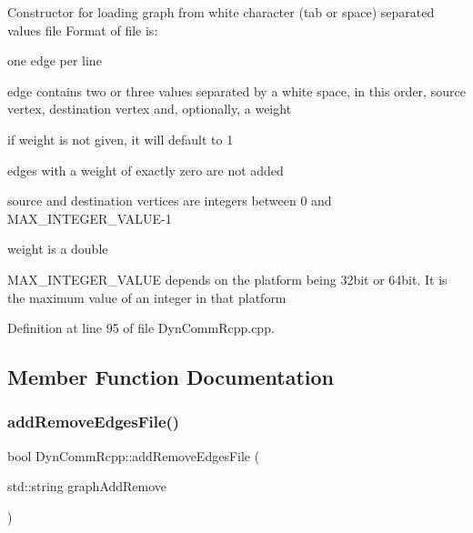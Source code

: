 Constructor for loading graph from white character (tab or space) separated values file Format of file is\+:
\begin{DoxyItemize}
\item one edge per line
\item edge contains two or three values separated by a white space, in this order, source vertex, destination vertex and, optionally, a weight
\item if weight is not given, it will default to 1
\item edges with a weight of exactly zero are not added
\item source and destination vertices are integers between 0 and M\+A\+X\+\_\+\+I\+N\+T\+E\+G\+E\+R\+\_\+\+V\+A\+L\+U\+E-\/1
\item weight is a double
\item M\+A\+X\+\_\+\+I\+N\+T\+E\+G\+E\+R\+\_\+\+V\+A\+L\+UE depends on the platform being 32bit or 64bit. It is the maximum value of an integer in that platform 
\end{DoxyItemize}

Definition at line 95 of file Dyn\+Comm\+Rcpp.\+cpp.



\subsection{Member Function Documentation}
\mbox{\label{classDynCommRcpp_a9080af5a73f77db6eff4d7a41596902a}} 
\subsubsection{\texorpdfstring{add\+Remove\+Edges\+File()}{addRemoveEdgesFile()}}
{\footnotesize\ttfamily bool Dyn\+Comm\+Rcpp\+::add\+Remove\+Edges\+File (\begin{DoxyParamCaption}\item[{std\+::string}]{graph\+Add\+Remove }\end{DoxyParamCaption})\hspace{0.3cm}{\ttfamily [inline]}}

